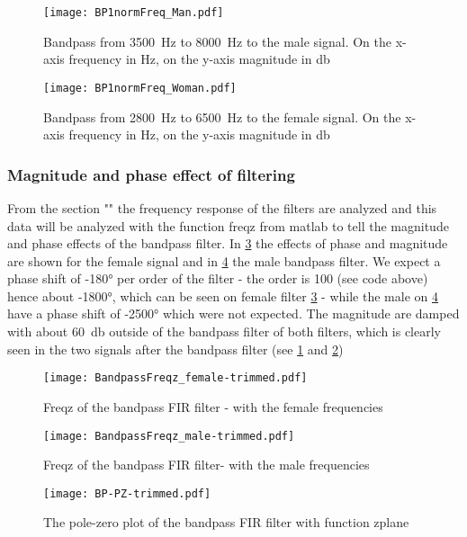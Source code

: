 \begin{figure}[h]
	\centering
	\texttt{[image: BP1normFreq\_Man.pdf]}
	\caption{Bandpass from \SI{3500}{\hertz} to \SI{8000}{\hertz} to the male signal. On the x-axis frequency in \si{\hertz}, on the y-axis magnitude in \si{\decibel}}
	\label{fig:maleBP}
\end{figure}

\begin{figure}[h]
	\centering
	\texttt{[image: BP1normFreq\_Woman.pdf]}
	\caption{Bandpass from \SI{2800}{\hertz} to \SI{6500}{\hertz} to the female signal. On the x-axis frequency in \si{\hertz}, on the y-axis magnitude in \si{\decibel}}
	\label{fig:femaleBP}
\end{figure}


\subsubsection{Magnitude and phase effect of filtering}
From the section "" the frequency response of the filters are analyzed and this data will be analyzed with the function freqz from matlab to tell the magnitude and phase effects of the bandpass filter. In \cref{fig:freqzBP} the effects of phase and magnitude are shown for the female signal and in \cref{fig:freqzBPMale} the male bandpass filter. We expect a phase shift of \ang{-180} per order of the filter - the order is 100 (see code above) hence about \ang{-1800}, which can be seen on female filter \cref{fig:freqzBP} - while the male on \cref{fig:freqzBPMale} have a phase shift of \ang{-2500} which were not expected. The magnitude are damped with about \SI{60}{\decibel} outside of the bandpass filter of both filters, which is clearly seen in the two signals after the bandpass filter (see \cref{fig:maleBP} and \cref{fig:femaleBP})

\begin{figure}[h]
	\centering
	\texttt{[image: BandpassFreqz\_female-trimmed.pdf]}
	\caption{Freqz of the bandpass FIR filter - with the female frequencies}
	\label{fig:freqzBP}
\end{figure}

\begin{figure}[h]
	\centering
	\texttt{[image: BandpassFreqz\_male-trimmed.pdf]}
	\caption{Freqz of the bandpass FIR filter- with the male frequencies}
	\label{fig:freqzBPMale}
\end{figure}

\begin{figure}
	\centering
	\texttt{[image: BP-PZ-trimmed.pdf]}
	\caption{The pole-zero plot of the bandpass FIR filter with function zplane}
	\label{fig:BP-zplane}
\end{figure}


